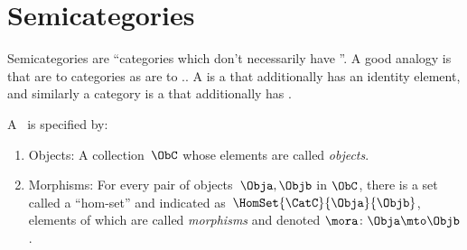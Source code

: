 

\section{Semicategories}
\label{sec:semicategories}

Semicategories are  ``categories which don't necessarily have ''.
A good analogy is that  are to categories as   are to ..
A  is a  that additionally has an identity element, and similarly a category is a  that additionally has .

\begin{ctdefinition}[Semicategory]
    \label{def:semicategory-compact}
    A ~\CatC is specified by:
    \begin{body}
        \constit
        \begin{enumerate}
            \item \label{semicategory-objects}
                  Objects: A collection\footnotemark~$\ObC$ whose elements are called \emph{objects}.
            \item \label{def:hom-set}
                  Morphisms: For every pair of objects~$\Obja,\Objb$ in $\ObC$, there is a set called a ``hom-set'' and indicated as~$\HomSet{\CatC}{\Obja}{\Objb}$, elements of which are called \emph{morphisms} and denoted $\mora \colon \Obja \mto \Objb$.


\end{enumerate}
\end{body}
\end{ctdefinition}
